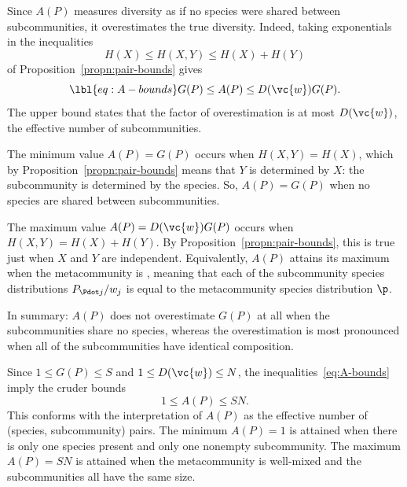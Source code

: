 Since $A(P)$ measures diversity as if no species were shared between
subcommunities, it overestimates the true diversity.  Indeed, taking
exponentials in the inequalities
\[
H(X) \leq H(X, Y) \leq H(X) + H(Y)
\]
of Proposition~\ref{propn:pair-bounds} gives
% 
\begin{equation}
\lbl{eq:A-bounds}
G(P) \leq A(P) \leq D(\vc{w}) G(P).
\end{equation}
% 
The upper bound states that the factor of overestimation is at most
$D(\vc{w})$, the effective number of subcommunities. 

The minimum value $A(P) = G(P)$ occurs when $H(X, Y) = H(X)$, which by
Proposition~\ref{propn:pair-bounds} means that $Y$
is determined by $X$: the subcommunity is determined by the species.  So,
$A(P) = G(P)$ when no species are shared between subcommunities.  

The maximum value $A(P) = D(\vc{w})G(P)$ occurs when $H(X, Y) = H(X) +
H(Y)$.  By Proposition~\ref{propn:pair-bounds},
this is true just when $X$ and $Y$ are independent.  Equivalently, $A(P)$
attains its maximum when the metacommunity is ,
meaning that each of the subcommunity species distributions $P_{\Pdot
  j}/w_j$ is equal to the metacommunity species distribution $\p$.

In summary: $A(P)$ does not overestimate $G(P)$ at all when the
subcommunities share no species, whereas the overestimation is most
pronounced when all of the subcommunities have identical composition.

Since $1 \leq G(P) \leq S$ and $1 \leq D(\vc{w}) \leq N$, the
inequalities~\eqref{eq:A-bounds} imply the cruder bounds
\[
1 \leq A(P) \leq SN.  
\]
This conforms with the interpretation of $A(P)$ as the effective number
of (species, subcommunity) pairs.  The minimum $A(P) = 1$ is attained when
there is only one species present and only one nonempty subcommunity.  The
maximum $A(P) = SN$ is attained when the metacommunity is well-mixed and the
subcommunities all have the same size.  


